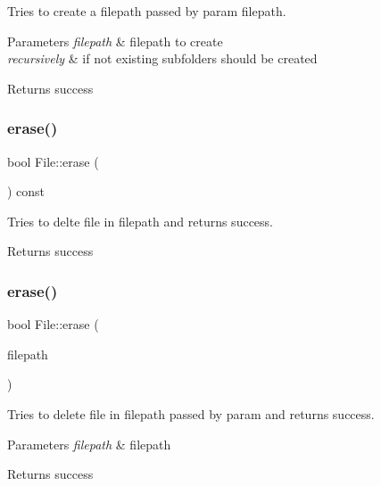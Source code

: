 Tries to create a filepath passed by param filepath. 


\begin{DoxyParams}{Parameters}
{\em filepath} & filepath to create \\
\hline
{\em recursively} & if not existing subfolders should be created \\
\hline
\end{DoxyParams}
\begin{DoxyReturn}{Returns}
success 
\end{DoxyReturn}
\mbox{\label{class_file_ad1eb2efb9d067dded30d4ef54eb307d1}} 
\subsubsection{\texorpdfstring{erase()}{erase()}\hspace{0.1cm}{\footnotesize\ttfamily [1/2]}}
{\footnotesize\ttfamily bool File\+::erase (\begin{DoxyParamCaption}{ }\end{DoxyParamCaption}) const}



Tries to delte file in filepath and returns success. 

\begin{DoxyReturn}{Returns}
success 
\end{DoxyReturn}
\mbox{\label{class_file_a068634b55657c13f0f79691434c399b1}} 
\subsubsection{\texorpdfstring{erase()}{erase()}\hspace{0.1cm}{\footnotesize\ttfamily [2/2]}}
{\footnotesize\ttfamily bool File\+::erase (\begin{DoxyParamCaption}\item[{const \mbox{\hyperlink{class_a_string}{A\+String}} \&}]{filepath }\end{DoxyParamCaption})\hspace{0.3cm}{\ttfamily [static]}}



Tries to delete file in filepath passed by param and returns success. 


\begin{DoxyParams}{Parameters}
{\em filepath} & filepath \\
\hline
\end{DoxyParams}
\begin{DoxyReturn}{Returns}
success 
\end{DoxyReturn}
\mbox{\label{class_file_a53118ce36851cb1c6845a82f915fd8ba}} 
